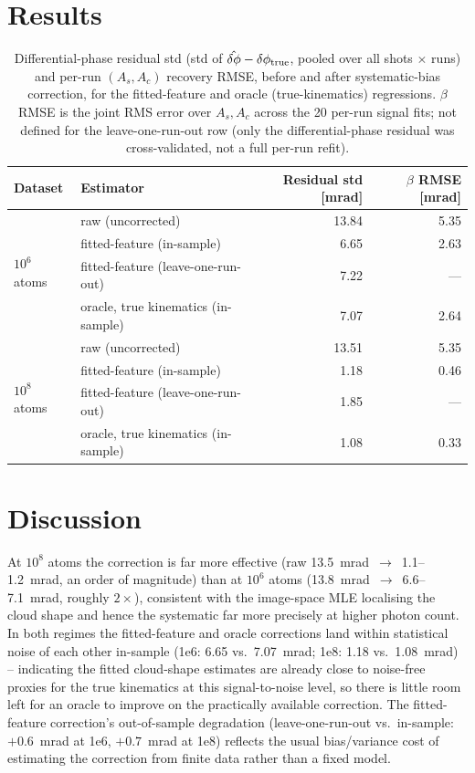 \documentclass[11pt,a4paper]{article}
\begin{document}
\section{Results}

\begin{table}[H]
\centering
\begin{tabular}{llrr}
\toprule
Dataset & Estimator & Residual std [mrad] & $\beta$ RMSE [mrad] \\
\midrule
\multirow[t]{4}{*}{$10^6$ atoms}
  & raw (uncorrected)             & 13.84 & 5.35 \\
  & fitted-feature (in-sample)    & 6.65  & 2.63 \\
  & fitted-feature (leave-one-run-out) & 7.22 & --- \\
  & oracle, true kinematics (in-sample) & 7.07 & 2.64 \\
\midrule
\multirow[t]{4}{*}{$10^8$ atoms}
  & raw (uncorrected)             & 13.51 & 5.35 \\
  & fitted-feature (in-sample)    & 1.18  & 0.46 \\
  & fitted-feature (leave-one-run-out) & 1.85 & --- \\
  & oracle, true kinematics (in-sample) & 1.08  & 0.33 \\
\bottomrule
\end{tabular}
\caption{Differential-phase residual std (std of $\hat{\delta\phi}-\delta\phi_{\rm true}$,
pooled over all shots $\times$ runs) and per-run $(A_s,A_c)$ recovery RMSE,
before and after systematic-bias correction, for the fitted-feature and
oracle (true-kinematics) regressions. $\beta$ RMSE is the joint
RMS error over $A_s,A_c$ across the 20 per-run signal fits; not defined
for the leave-one-run-out row (only the differential-phase residual was
cross-validated, not a full per-run refit).}
\end{table}

\section{Discussion}

At $10^8$ atoms the correction is far more effective (raw
13.5~mrad~$\to$~1.1--1.2~mrad, an order of magnitude) than at $10^6$ atoms
(13.8~mrad~$\to$~6.6--7.1~mrad, roughly $2\times$), consistent with the
image-space MLE localising the cloud shape and hence the systematic far
more precisely at higher photon count. In both regimes the fitted-feature
and oracle corrections land within statistical noise of each other
in-sample (1e6: 6.65 vs.\ 7.07~mrad; 1e8: 1.18 vs.\ 1.08~mrad) --
indicating the fitted cloud-shape estimates are already close to
noise-free proxies for the true kinematics at this signal-to-noise level,
so there is little room left for an oracle to improve on the practically
available correction. The fitted-feature correction's out-of-sample
degradation (leave-one-run-out vs.\ in-sample: $+0.6$~mrad at 1e6,
$+0.7$~mrad at 1e8) reflects the usual bias/variance cost of estimating
the correction from finite data rather than a fixed model.
\end{document}
